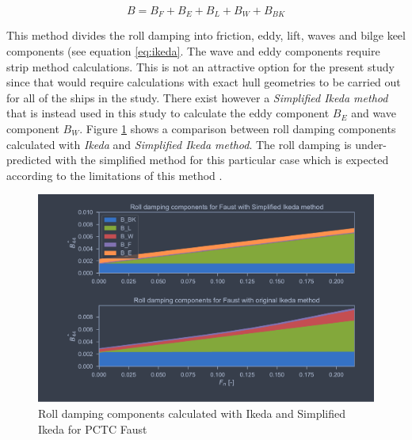 \begin{equation} \label{eq:ikeda}
B = B_F + B_E + B_L + B_W + B_{BK}
\end{equation}

This method divides the roll damping into friction, eddy, lift, waves and bilge keel components (see equation \ref{eq:ikeda}. The wave and eddy components require strip method calculations. This is not an attractive option for the present study since that would require calculations with exact hull geometries to be carried out for all of the ships in the study. There exist however a \emph{Simplified Ikeda method} \cite{kawahara_simple_2011} that is instead used in this study to calculate the eddy component $B_E$ and wave component $B_W$. Figure \ref{fig:ikeda_vs_simplified} shows a comparison between roll damping components calculated with \emph{Ikeda} and \emph{Simplified Ikeda method}. The roll damping is under-predicted with the simplified method for this particular case which is expected according to the limitations of this method  \cite{kawahara_simple_2011}.

\begin{figure}[h]
    \centering
    \includegraphics[width=\columnwidth]{figures/ikeda_vs_simplified.pdf}
    \caption{Roll damping components calculated with Ikeda and Simplified Ikeda for PCTC Faust}
    \label{fig:ikeda_vs_simplified}
\end{figure}



